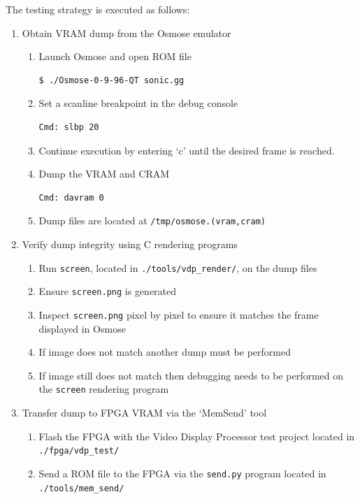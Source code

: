 \documentclass{article}
\begin{document}
The testing strategy is executed as follows:
\begin{enumerate}
    \item Obtain VRAM dump from the Osmose emulator
        \begin{enumerate}
            \item Launch Osmose and open ROM file
                \begin{verbatim}$ ./Osmose-0-9-96-QT sonic.gg\end{verbatim}
            \item Set a scanline breakpoint in the debug console
                \begin{verbatim}Cmd: slbp 20\end{verbatim}
            \item Continue execution by entering `c' until the desired frame is reached.
            \item Dump the VRAM and CRAM
                \begin{verbatim}Cmd: davram 0\end{verbatim}
            \item Dump files are located at \texttt{/tmp/osmose.(vram,cram)}
        \end{enumerate}
    \item Verify dump integrity using C rendering programs
        \begin{enumerate}
            \item Run \texttt{screen}, located in \texttt{./tools/vdp\_render/}, on the dump files
            \item Ensure \texttt{screen.png} is generated
            \item Inspect \texttt{screen.png} pixel by pixel to ensure it matches the frame displayed in Osmose
            \item If image does not match another dump must be performed
            \item If image still does not match then debugging needs to be performed on the \texttt{screen} rendering program
        \end{enumerate}
    \item Transfer dump to FPGA VRAM via the `MemSend' tool
        \begin{enumerate}
            \item Flash the FPGA with the Video Display Processor test project located in \texttt{./fpga/vdp\_test/}
            \item Send a ROM file to the FPGA via the \texttt{send.py} program located in \texttt{./tools/mem\_send/}

\end{enumerate}
\end{enumerate}
\end{document}
